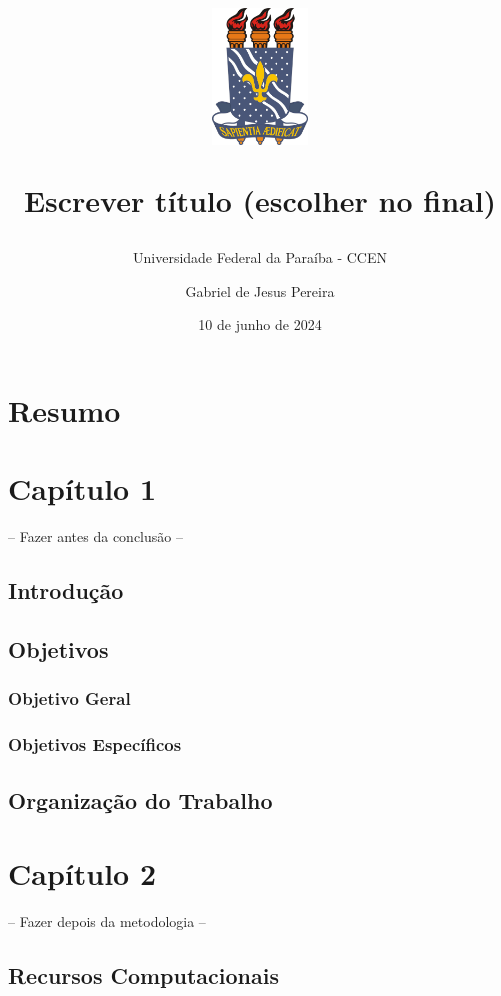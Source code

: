 \documentclass[
  letterpaper,
  DIV=11,
  numbers=noendperiod]{scrreprt}
\title{\includegraphics[width=1in,height=\textheight]{includes/ufpb.png}

Escrever título (escolher no final)}
\subtitle{Universidade Federal da Paraíba - CCEN}
\author{Gabriel de Jesus Pereira}
\date{10 de junho de 2024}
\renewcommand*\contentsname{Índice}
\newcommand\contentsname{Índice}
\begin{document}
\maketitle

\renewcommand*\contentsname{Índice}
{
\hypersetup{linkcolor=}
\setcounter{tocdepth}{2}
\tableofcontents
}
\chapter{Resumo}\label{resumo}

\chapter{Capítulo 1}\label{capuxedtulo-1}

-- Fazer antes da conclusão --

\section{Introdução}\label{introduuxe7uxe3o}

\section{Objetivos}\label{objetivos}

\subsection{Objetivo Geral}\label{objetivo-geral}

\subsection{Objetivos Específicos}\label{objetivos-especuxedficos}

\section{Organização do Trabalho}\label{organizauxe7uxe3o-do-trabalho}

\newpage

\chapter{Capítulo 2}\label{capuxedtulo-2}

-- Fazer depois da metodologia --

\section{Recursos Computacionais}\label{recursos-computacionais}
\end{document}

